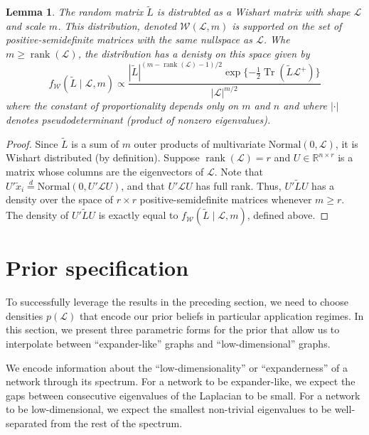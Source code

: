 \documentclass[12pt]{article}
\newcommand{\reals}{\mathbb{R}}
\DeclareMathOperator*{\Tr}{Tr}
\DeclareMathOperator*{\rank}{rank}
\theoremstyle{plain}
\newtheorem{lemma}[theorem]{Lemma}
\begin{document}
\begin{lemma}\label{L:approx-wishart}
  The random matrix $\tilde L$ is distrubted as a Wishart matrix with
  shape $\mathcal{L}$ and scale $m$.  This distribution, denoted
  $\mathcal{W}(\mathcal{L}, m)$ is supported on the set of
  positive-semidefinite matrices with the same nullspace as $\mathcal{L}$.  Whe
  $m \geq \rank(\mathcal{L})$, the distribution has a denisty on this space
  given by
  \begin{equation}\label{E:wishart-density}
   f_\mathcal{W}( \tilde L \mid \mathcal{L}, m)
      \propto
      \frac{|\tilde L|^{(m - \rank(\mathcal{L}) - 1)/2}
        \exp\{-\tfrac{1}{2} \Tr(\tilde L \mathcal{L}^+) \}}
        {|\mathcal{L}|^{m/2}}
  \end{equation}
  where the constant of proportionality depends only on $m$ and $n$
  and where $|\cdot|$ denotes pseudodeterminant (product of nonzero
  eigenvalues).
\end{lemma}
\begin{proof}
  Since $\tilde L$ is a sum of $m$ outer products of multivariate
  $\mathrm{Normal}(0, \mathcal{L})$, it is Wishart distributed
  (by definition).
  Suppose $\rank(\mathcal{L}) = r$ and
  $U \in \reals^{n \times r}$ is a matrix whose columns are the
    eigenvectors of $\mathcal{L}$.  Note that
    $U' \tilde x_i \overset{d}{=} \mathrm{Normal}(0, U' \mathcal{L} U)$,
    and that $U' \mathcal{L} U$ has full rank.  Thus,
    \(
      U' \tilde L U
    \)
    has a density over the space of $r \times r$ positive-semidefinite
    matrices whenever $m \geq r$.  The density of $U' \tilde L U$ is
    exactly equal to $f_\mathcal{W}(\tilde L \mid \mathcal{L}, m)$,
    defined above.
\end{proof}



\section{Prior specification}

To successfully leverage the results in the preceding section, we need
to choose densities $p(\mathcal{L})$ that encode our prior beliefs in
particular application regimes.  In this section, we present three
parametric forms for the prior that allow us to interpolate between
``expander-like'' graphs and ``low-dimensional'' graphs.

We encode information about the
``low-dimensionality'' or ``expanderness'' of a network through its
spectrum.  For a network to be expander-like, we expect the gaps
between consecutive eigenvalues of the Laplacian to be small.  For a
network to be low-dimensional, we expect the smallest non-trivial
eigenvalues to be well-separated from the rest of the spectrum.
\end{document}

